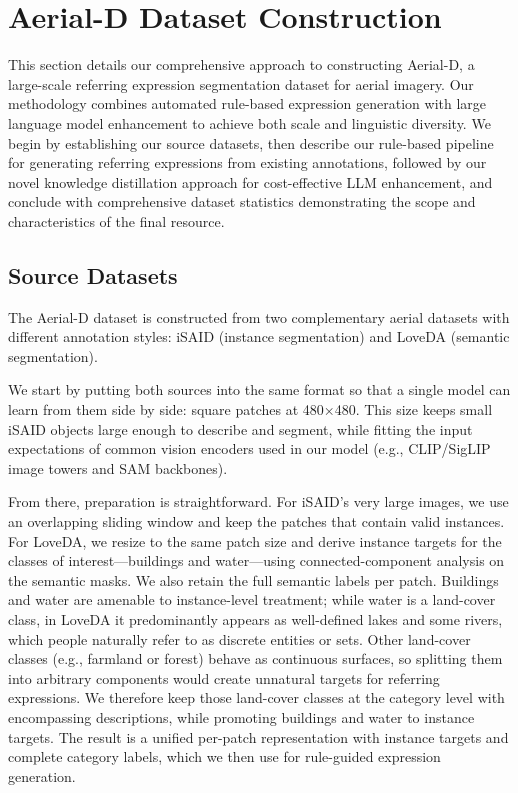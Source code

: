 
\section{Aerial-D Dataset Construction}
\label{sec:approach}

This section details our comprehensive approach to constructing Aerial-D, a large-scale referring expression segmentation dataset for aerial imagery. Our methodology combines automated rule-based expression generation with large language model enhancement to achieve both scale and linguistic diversity. We begin by establishing our source datasets, then describe our rule-based pipeline for generating referring expressions from existing annotations, followed by our novel knowledge distillation approach for cost-effective LLM enhancement, and conclude with comprehensive dataset statistics demonstrating the scope and characteristics of the final resource.

\subsection{Source Datasets}

The Aerial-D dataset is constructed from two complementary aerial datasets with different annotation styles: iSAID (instance segmentation) and LoveDA (semantic segmentation).

We start by putting both sources into the same format so that a single model can learn from them side by side: square patches at 480×480. This size keeps small iSAID objects large enough to describe and segment, while fitting the input expectations of common vision encoders used in our model (e.g., CLIP/SigLIP image towers and SAM backbones\cite{clip,siglip,sam}).

From there, preparation is straightforward. For iSAID’s very large images, we use an overlapping sliding window and keep the patches that contain valid instances. For LoveDA, we resize to the same patch size and derive instance targets for the classes of interest—buildings and water—using connected-component analysis on the semantic masks. We also retain the full semantic labels per patch. Buildings and water are amenable to instance-level treatment; while water is a land-cover class, in LoveDA it predominantly appears as well-defined lakes and some rivers, which people naturally refer to as discrete entities or sets. Other land-cover classes (e.g., farmland or forest) behave as continuous surfaces, so splitting them into arbitrary components would create unnatural targets for referring expressions. We therefore keep those land-cover classes at the category level with encompassing descriptions, while promoting buildings and water to instance targets. The result is a unified per-patch representation with instance targets and complete category labels, which we then use for rule-guided expression generation.

